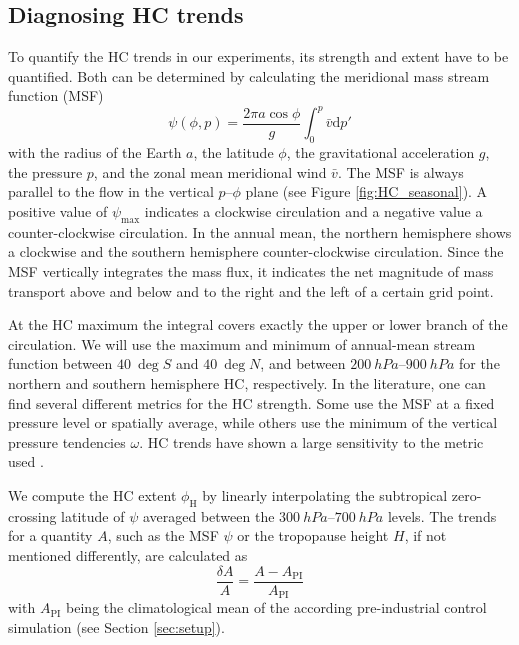 \subsection{Diagnosing HC trends}
\label{sec:def_HC}
To quantify the HC trends in our experiments, its strength and extent have to be quantified. Both can be determined by calculating the meridional mass stream function (MSF)
\begin{equation}\label{eq:msf}
    \psi(\phi,p)=\frac{2\pi a\cos\phi}{g}\int_0^{p}\bar{v}\mathrm{d}p'
\end{equation}
with the radius of the Earth $a$, the latitude $\phi$, the gravitational acceleration $g$, the pressure $p$, and the zonal mean meridional wind $\bar{v}$.
The MSF is always parallel to the flow in the vertical $p$--$\phi$ plane (see Figure \ref{fig:HC_seasonal}). A positive value of $\psi_\mathrm{max}$ indicates a clockwise circulation and a negative value a counter-clockwise circulation. In the annual mean, the northern hemisphere shows a clockwise and the southern hemisphere counter-clockwise circulation. Since the MSF vertically integrates the mass flux, it indicates the net magnitude of mass transport above and below and to the right and the left of a certain grid point.

At the HC maximum the integral covers exactly the upper or lower branch of the circulation. We will use the maximum and minimum of annual-mean stream function between $\SI{40}{\deg S}$ and $\SI{40}{\deg N}$, and between $\SIrange{200}{900}{hPa}$ for the northern and southern hemisphere HC, respectively. In the literature, one can find several different metrics for the HC strength. Some use the MSF at a fixed pressure level or spatially average, while others use the minimum of the vertical pressure tendencies $\omega$. HC trends have shown a large sensitivity to the metric used \parencite{pikovnikMetricsHadleyCirculation2022}.

We compute the HC extent $\phi_\mathrm{H}$ by linearly interpolating the subtropical zero-crossing latitude of $\psi$ averaged between the $\SIrange{300}{700}{hPa}$ levels.
The trends for a quantity $A$, such as the MSF $\psi$ or the tropopause height $H$, if not mentioned differently, are calculated as 
\begin{equation} \label{eq:anomalies}
    \frac{\delta A}{A}=\frac{A-A_\mathrm{PI}}{A_\mathrm{PI}} 
\end{equation}
with $A_\mathrm{PI}$ being the climatological mean of the according pre-industrial control simulation (see Section \ref{sec:setup}).

